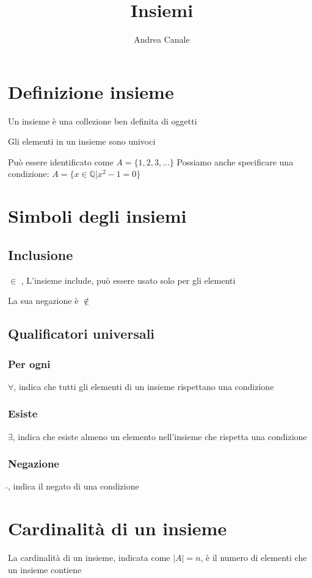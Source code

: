 \documentclass[a4paper, 10pt]{article}
\title{Insiemi}
\author{Andrea Canale}
\begin{document}
\maketitle
\tableofcontents

\section{Definizione insieme}

Un insieme è una collezione ben definita di oggetti

Gli elementi in un insieme sono univoci

Può essere identificato come $ A = \{1, 2, 3, ...\} $
Possiamo anche specificare una condizione: $ A = \{ x \in \mathbb{Q} | x^2 - 1 = 0 \} $
\section{Simboli degli insiemi}

\subsection{Inclusione}
$ \in $ , L'insieme include, può essere usato solo per gli elementi

La sua negazione è $ \notin $

\subsection{Qualificatori universali}

\subsubsection{Per ogni}
$ \forall $, indica che tutti gli elementi di un insieme rispettano una condizione

\subsubsection{Esiste}
$ \exists $, indica che esiste almeno un elemento nell'insieme che rispetta una condizione

\subsubsection{Negazione}
$ \tilde{} $, indica il negato di una condizione

\section{Cardinalità di un insieme}
La cardinalità di un insieme, indicata come $ |A| = n $, è il numero di elementi che un insieme contiene
\end{document}
